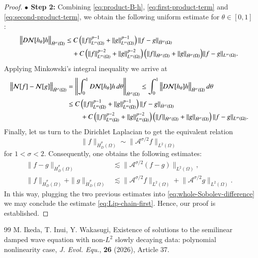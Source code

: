 \documentclass[10pt,a4paper]{amsart}
\numberwithin{equation}{section}
\begin{document}
\begin{proof}
\noindent\textbf{$\bullet$ Step 2:} Combining \eqref{eq:product-B-h},
\eqref{eq:first-product-term} and
\eqref{eq:second-product-term}, we obtain the following uniform estimate for \(\theta\in[0,1]\):
\begin{align*}
\big\|D\mathcal{N}[h_\theta] h\big\|_{\dot H^\sigma(\Omega)}
&\le
C
\left(
\|f\|_{L^\infty(\Omega)}^{p-1}
+
\|g\|_{L^\infty(\Omega)}^{p-1}
\right)
\|f-g\|_{\dot H^\sigma(\Omega)}
\notag\\
&\quad+
C
\left(
\|f\|_{L^\infty(\Omega)}^{p-2}
+
\|g\|_{L^\infty(\Omega)}^{p-2}
\right) \Big(
\|f\|_{\dot H^\sigma(\Omega)}
+
\|g\|_{\dot H^\sigma(\Omega)}
\Big)
\|f-g\|_{L^\infty(\Omega)}.
\end{align*}
Applying Minkowski's integral inequality we arrive at
\begin{align}
\big\|\mathcal N[f]-\mathcal N[g]\big\|_{\dot H^\sigma(\Omega)}
&=
\left\|
\int_0^1 D\mathcal{N}[h_\theta] h\,d\theta
\right\|_{\dot H^\sigma(\Omega)}
\le
\int_0^1
\big\|D\mathcal{N}[h_\theta] h\big\|_{\dot H^\sigma(\Omega)}
\,d\theta \notag \\
&\le
C
\left(
\|f\|_{L^\infty(\Omega)}^{p-1}
+
\|g\|_{L^\infty(\Omega)}^{p-1}
\right)
\|f-g\|_{\dot H^\sigma(\Omega)} \notag \\
&\qquad+
C
\left(
\|f\|_{L^\infty(\Omega)}^{p-2}
+
\|g\|_{L^\infty(\Omega)}^{p-2}
\right) \left(
\|f\|_{\dot H^\sigma(\Omega)}
+
\|g\|_{\dot H^\sigma(\Omega)}
\right)
\|f-g\|_{L^\infty(\Omega)}.
\label{eq:whole-Sobolev-difference}
\end{align}
Finally, let us turn to the Dirichlet Laplacian to get the equivalent relation
\begin{equation*}
\|f\|_{\dot H_D^\sigma(\Omega)}
\sim
\|\mathcal A^{\sigma/2}f\|_{L^2(\Omega)}
\end{equation*}
for \(1<\sigma<2\). Consequently, one obtains the following estimates:
\begin{align*}
    \|f-g\|_{\dot H_D^\sigma(\Omega)}
&\lesssim
\big\|\mathcal A^{\sigma/2}(f-g)\big\|_{L^2(\Omega)}, \\
\|f\|_{\dot H_D^\sigma(\Omega)}
+
\|g\|_{\dot H_D^\sigma(\Omega)}
&\lesssim
\big\|\mathcal A^{\sigma/2}f\big\|_{L^2(\Omega)}
+
\big\|\mathcal A^{\sigma/2}g\big\|_{L^2(\Omega)}.
\end{align*}
In this way, plugging the two previous estimates into \eqref{eq:whole-Sobolev-difference} we may conclude the estimate \eqref{eq:Lip-chain-first}. Hence, our proof is established.
\end{proof}


\begin{thebibliography}{99}
 M. Ikeda, T. Inui, Y. Wakasugi, Existence of solutions to the semilinear damped wave equation with non-\(L^2\) slowly decaying data: polynomial nonlinearity case, \textit{J. Evol. Equ.}, \textbf{26} (2026), Article 37.
\end{thebibliography}
\end{document}
